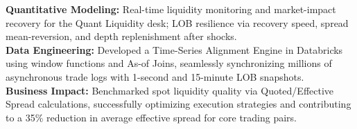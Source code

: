 \documentclass[letterpaper]{deedy-resume}
\begin{document}
\begin{minipage}[t]{0.66\textwidth}
\runsubsection{}
\textbf{Quantitative Modeling:} Real-time liquidity monitoring and market-impact recovery for the Quant Liquidity desk; LOB resilience via recovery speed, spread mean-reversion, and depth replenishment after shocks. \\
\textbf{Data Engineering:} Developed a Time-Series Alignment Engine in Databricks using window functions and As-of Joins, seamlessly synchronizing millions of asynchronous trade logs with 1-second and 15-minute LOB snapshots. \\
\textbf{Business Impact:} Benchmarked spot liquidity quality via Quoted/Effective Spread calculations, successfully optimizing execution strategies and contributing to a 35\% reduction in average effective spread for core trading pairs.









\end{minipage}
\end{document}
